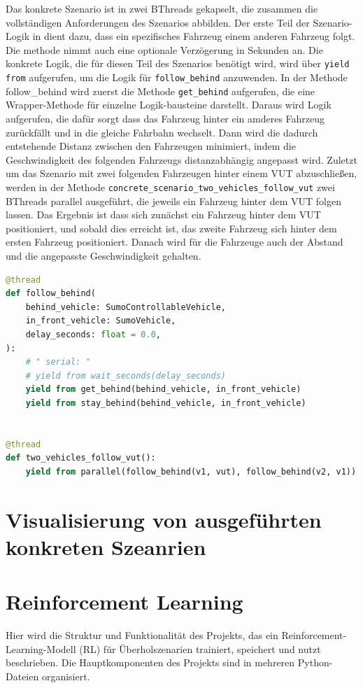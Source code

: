 Das konkrete Szenario ist in zwei BThreads gekapselt, die zusammen die vollständigen Anforderungen des Szenarios abbilden. Der erste Teil der Szenario-Logik in dient dazu, dass ein spezifisches Fahrzeug einem anderen Fahrzeug folgt. Die methode nimmt auch eine optionale Verzögerung in Sekunden an.
Die konkrete Logik, die für diesen Teil des Szenarios benötigt wird, wird über \texttt{yield from} aufgerufen, um die Logik für \texttt{follow\_behind} anzuwenden. In der Methode follow\_behind wird zuerst die Methode \texttt{get\_behind} aufgerufen, die eine Wrapper-Methode für einzelne Logik-bausteine darstellt.
Daraus wird Logik aufgerufen, die dafür sorgt dass das Fahrzeug hinter ein amderes Fahrzeug zurückfällt und in die gleiche Fahrbahn wechselt. Dann wird die dadurch entstehende Distanz zwischen den Fahrzeugen minimiert, indem die Geschwindigkeit des folgenden Fahrzeugs distanzabhängig angepasst wird.
Zuletzt um das Szenario mit zwei folgenden Fahrzeugen hinter einem VUT abzuschließen, werden in der Methode \texttt{concrete\_scenario\_two\_vehicles\_follow\_vut} zwei BThreads parallel ausgeführt, die jeweils ein Fahrzeug hinter dem VUT folgen lassen.
Das Ergebnis ist dass sich zunächst ein Fahrzeug hinter dem VUT positioniert, und sobald dies erreicht ist, das zweite Fahrzeug sich hinter dem ersten Fahrzeug positioniert. Danach wird für die Fahrzeuge auch der Abstand und die angepasste Geschwindigkeit gehalten.
\begin{lstlisting}[language=Python, caption=Konkretes Szenario: Zwei Fahrzeuge folgen dem VUT - Relevante BThreads]
@thread
def follow_behind(
    behind_vehicle: SumoControllableVehicle,
    in_front_vehicle: SumoVehicle,
    delay_seconds: float = 0.0,
):
    # " serial: "
    # yield from wait_seconds(delay_seconds)
    yield from get_behind(behind_vehicle, in_front_vehicle)
    yield from stay_behind(behind_vehicle, in_front_vehicle)


@thread
def two_vehicles_follow_vut():
    yield from parallel(follow_behind(v1, vut), follow_behind(v2, v1))
\end{lstlisting}

\section{Visualisierung von ausgeführten konkreten Szeanrien}
\section{Reinforcement Learning}
Hier wird die Struktur und Funktionalität des Projekts, das ein Reinforcement-Learning-Modell (RL) für Überholszenarien trainiert, speichert und nutzt beschrieben. Die Hauptkomponenten des Projekts sind in mehreren Python-Dateien organisiert.

